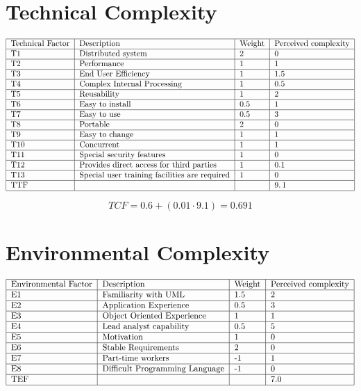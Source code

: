 \documentclass{article}
\begin{document}
\section{Technical Complexity}

\[
\begin{tabular}{|l|l|l|l|}
\hline
Technical Factor & Description & Weight & Perceived complexity \\ \hline
T1 & Distributed system & 2 & 0 \\ \hline
T2 & Performance & 1 & 1 \\ \hline
T3 & End User Efficiency & 1 & 1.5 \\ \hline
T4 & Complex Internal Processing & 1 & 0.5 \\ \hline
T5 & Reusability & 1 & 2 \\ \hline
T6 & Easy to install & 0.5 & 1 \\ \hline
T7 & Easy to use & 0.5 & 3 \\ \hline
T8 & Portable & 2 & 0 \\ \hline
T9 & Easy to change & 1 & 1 \\ \hline
T10 & Concurrent & 1 & 1 \\ \hline
T11 & Special security features & 1 & 0 \\ \hline
T12 & Provides direct access for third parties & 1 & 0.1 \\ \hline
T13 & Special user training facilities are required & 1 & 0 \\ \hline
TTF &  &  & $9.\,\allowbreak 1$ \\ \hline
\end{tabular}%
\]

\[
TCF=0.6+\left( 0.01\cdot 9.1\right) =\allowbreak 0.691 
\]%
$\,$

\section{Environmental Complexity}

\[
\begin{tabular}{|l|l|l|l|}
\hline
Environmental Factor & Description & Weight & Perceived complexity \\ \hline
E1 & Familiarity with UML & 1.5 & 2 \\ \hline
E2 & Application Experience & 0.5 & 3 \\ \hline
E3 & Object Oriented Experience & 1 & 1 \\ \hline
E4 & Lead analyst capability & 0.5 & 5 \\ \hline
E5 & Motivation & 1 & 0 \\ \hline
E6 & Stable Requirements & 2 & 0 \\ \hline
E7 & Part-time workers & -1 & 1 \\ \hline
E8 & Difficult Programming Language & -1 & 0 \\ \hline
TEF &  &  & $7.0$ \\ \hline
\end{tabular}%
\]
\end{document}
